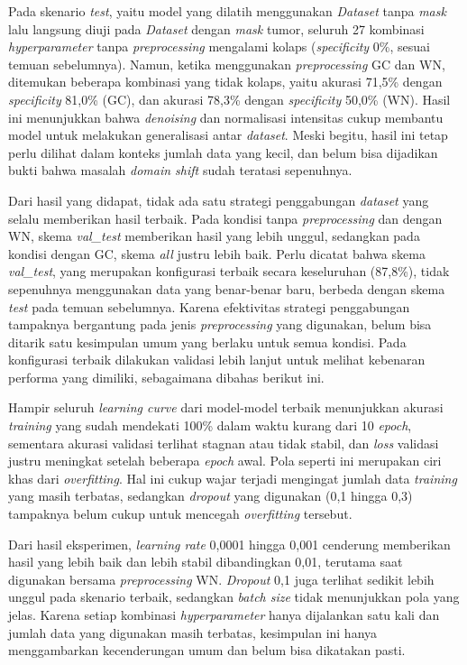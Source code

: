 Pada skenario \textit{test}, yaitu model yang dilatih menggunakan \textit{Dataset} tanpa \textit{mask} lalu langsung diuji pada \textit{Dataset} dengan \textit{mask} tumor, seluruh 27 kombinasi \textit{hyperparameter} tanpa \textit{preprocessing} mengalami kolaps (\textit{specificity} 0\%, sesuai temuan sebelumnya). Namun, ketika menggunakan \textit{preprocessing} GC dan WN, ditemukan beberapa kombinasi yang tidak kolaps, yaitu akurasi 71,5\% dengan \textit{specificity} 81,0\% (GC), dan akurasi 78,3\% dengan \textit{specificity} 50,0\% (WN). Hasil ini menunjukkan bahwa \textit{denoising} dan normalisasi intensitas cukup membantu model untuk melakukan generalisasi antar \textit{dataset}. Meski begitu, hasil ini tetap perlu dilihat dalam konteks jumlah data yang kecil, dan belum bisa dijadikan bukti bahwa masalah \textit{domain shift} sudah teratasi sepenuhnya.

Dari hasil yang didapat, tidak ada satu strategi penggabungan \textit{dataset} yang selalu memberikan hasil terbaik. Pada kondisi tanpa \textit{preprocessing} dan dengan WN, skema \textit{val\_test} memberikan hasil yang lebih unggul, sedangkan pada kondisi dengan GC, skema \textit{all} justru lebih baik. Perlu dicatat bahwa skema \textit{val\_test}, yang merupakan konfigurasi terbaik secara keseluruhan (87,8\%), tidak sepenuhnya menggunakan data yang benar-benar baru, berbeda dengan skema \textit{test} pada temuan sebelumnya. Karena efektivitas strategi penggabungan tampaknya bergantung pada jenis \textit{preprocessing} yang digunakan, belum bisa ditarik satu kesimpulan umum yang berlaku untuk semua kondisi. Pada konfigurasi terbaik dilakukan validasi lebih lanjut untuk melihat kebenaran performa yang dimiliki, sebagaimana dibahas berikut ini.

Hampir seluruh \textit{learning curve} dari model-model terbaik menunjukkan akurasi \textit{training} yang sudah mendekati 100\% dalam waktu kurang dari 10 \textit{epoch}, sementara akurasi validasi terlihat stagnan atau tidak stabil, dan \textit{loss} validasi justru meningkat setelah beberapa \textit{epoch} awal. Pola seperti ini merupakan ciri khas dari \textit{overfitting}. Hal ini cukup wajar terjadi mengingat jumlah data \textit{training} yang masih terbatas, sedangkan \textit{dropout} yang digunakan (0,1 hingga 0,3) tampaknya belum cukup untuk mencegah \textit{overfitting} tersebut.

Dari hasil eksperimen, \textit{learning rate} 0,0001 hingga 0,001 cenderung memberikan hasil yang lebih baik dan lebih stabil dibandingkan 0,01, terutama saat digunakan bersama \textit{preprocessing} WN. \textit{Dropout} 0,1 juga terlihat sedikit lebih unggul pada skenario terbaik, sedangkan \textit{batch size} tidak menunjukkan pola yang jelas. Karena setiap kombinasi \textit{hyperparameter} hanya dijalankan satu kali dan jumlah data yang digunakan masih terbatas, kesimpulan ini hanya menggambarkan kecenderungan umum dan belum bisa dikatakan pasti.


